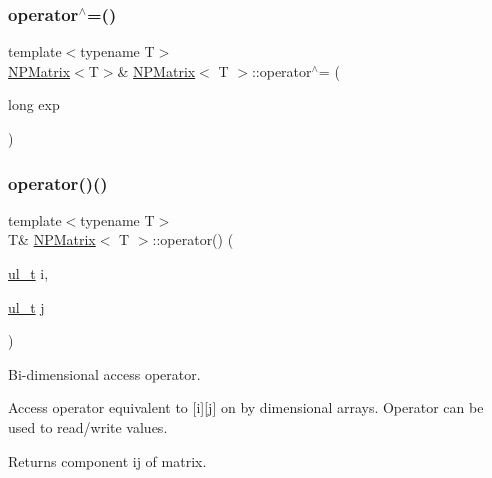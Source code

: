 \subsubsection{\texorpdfstring{operator$^\wedge$=()}{operator^=()}}
{\footnotesize\ttfamily template$<$typename T$>$ \\
\mbox{\hyperlink{class_n_p_matrix}{N\+P\+Matrix}}$<$T$>$\& \mbox{\hyperlink{class_n_p_matrix}{N\+P\+Matrix}}$<$ T $>$\+::operator$^\wedge$= (\begin{DoxyParamCaption}\item[{long}]{exp }\end{DoxyParamCaption})\hspace{0.3cm}{\ttfamily [inline]}}

\mbox{\label{class_n_p_matrix_a437ba12a96e979b50f6d579400b20f6f}} 
\subsubsection{\texorpdfstring{operator()()}{operator()()}\hspace{0.1cm}{\footnotesize\ttfamily [1/4]}}
{\footnotesize\ttfamily template$<$typename T$>$ \\
T\& \mbox{\hyperlink{class_n_p_matrix}{N\+P\+Matrix}}$<$ T $>$\+::operator() (\begin{DoxyParamCaption}\item[{\mbox{\hyperlink{typedef_8h_a1b140a2034db3f5dfe18a987745df43a}{ul\+\_\+t}}}]{i,  }\item[{\mbox{\hyperlink{typedef_8h_a1b140a2034db3f5dfe18a987745df43a}{ul\+\_\+t}}}]{j }\end{DoxyParamCaption})\hspace{0.3cm}{\ttfamily [inline]}}



Bi-\/dimensional access operator. 

Access operator equivalent to {\ttfamily \mbox{[}i\mbox{]}\mbox{[}j\mbox{]}} on by dimensional arrays. Operator can be used to read/write values. \begin{DoxyReturn}{Returns}
component ij of matrix. 
\end{DoxyReturn}
\mbox{\label{class_n_p_matrix_aa512abe782fac9e6b0d2eb1167df4133}} 
